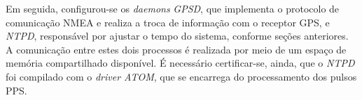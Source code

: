 \vspace{12pt}

Em seguida, configurou-se os \textit{daemons} \textit{GPSD}, que implementa o
protocolo de comunicação NMEA e realiza a troca de informação com o receptor
GPS, e \textit{NTPD}, responsável por ajustar o tempo do sistema, conforme
seções anteriores. A comunicação entre estes dois processos é realizada por meio de um
espaço de memória compartilhado disponível. É necessário certificar-se, ainda,
que o \textit{NTPD} foi compilado com o \textit{driver ATOM}, que se encarrega
do processamento dos pulsos PPS.

% 
%  
% 
% 
% 
% 
%  
% 
% 
% 

